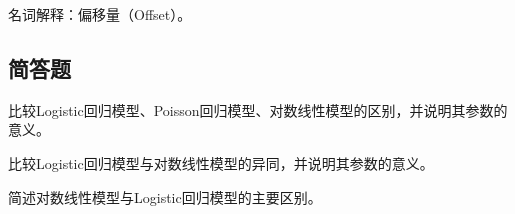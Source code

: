 \par\addvspace{8pt}\noindent\begin{minipage}{\linewidth}


名词解释：偏移量（Offset）。



\end{minipage}\par\vspace{5pt}

\par\addvspace{8pt}\noindent\begin{minipage}{\linewidth}

\subsection{简答题}


比较Logistic回归模型、Poisson回归模型、对数线性模型的区别，并说明其参数的意义。



\end{minipage}\par\vspace{5pt}

\par\addvspace{8pt}\noindent\begin{minipage}{\linewidth}


比较Logistic回归模型与对数线性模型的异同，并说明其参数的意义。



\end{minipage}\par\vspace{5pt}

\par\addvspace{8pt}\noindent\begin{minipage}{\linewidth}


简述对数线性模型与Logistic回归模型的主要区别。



\end{minipage}\par\vspace{5pt}

